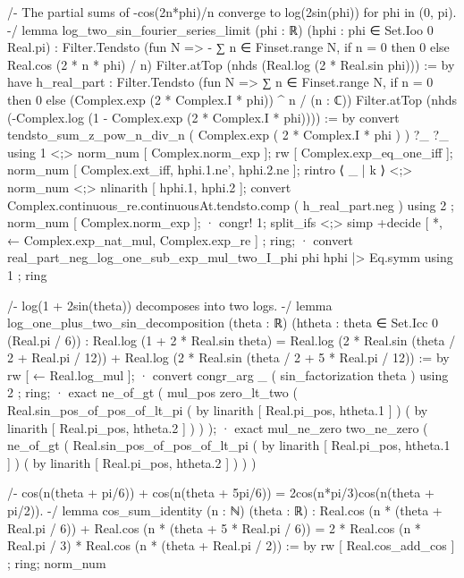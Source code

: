 /-
The partial sums of -cos(2n*phi)/n converge to log(2sin(phi)) for phi in (0, pi).
-/
lemma log_two_sin_fourier_series_limit (phi : ℝ) (hphi : phi ∈ Set.Ioo 0 Real.pi) :
  Filter.Tendsto (fun N => - ∑ n ∈ Finset.range N, if n = 0 then 0 else Real.cos (2 * n * phi) / n) Filter.atTop (nhds (Real.log (2 * Real.sin phi))) := by
    have h_real_part : Filter.Tendsto (fun N => ∑ n ∈ Finset.range N, if n = 0 then 0 else (Complex.exp (2 * Complex.I * phi)) ^ n / (n : ℂ)) Filter.atTop (nhds (-Complex.log (1 - Complex.exp (2 * Complex.I * phi)))) := by
      convert tendsto_sum_z_pow_n_div_n ( Complex.exp ( 2 * Complex.I * phi ) ) ?_ ?_ using 1 <;> norm_num [ Complex.norm_exp ];
      rw [ Complex.exp_eq_one_iff ];
      norm_num [ Complex.ext_iff, hphi.1.ne', hphi.2.ne ];
      rintro ⟨ _ | k ⟩ <;> norm_num <;> nlinarith [ hphi.1, hphi.2 ];
    convert Complex.continuous_re.continuousAt.tendsto.comp ( h_real_part.neg ) using 2 ; norm_num [ Complex.norm_exp ];
    · congr! 1;
      split_ifs <;> simp +decide [ *, ← Complex.exp_nat_mul, Complex.exp_re ] ; ring;
    · convert real_part_neg_log_one_sub_exp_mul_two_I_phi phi hphi |> Eq.symm using 1 ; ring

/-
log(1 + 2sin(theta)) decomposes into two logs.
-/
lemma log_one_plus_two_sin_decomposition (theta : ℝ) (htheta : theta ∈ Set.Icc 0 (Real.pi / 6)) :
  Real.log (1 + 2 * Real.sin theta) =
  Real.log (2 * Real.sin (theta / 2 + Real.pi / 12)) + Real.log (2 * Real.sin (theta / 2 + 5 * Real.pi / 12)) := by
    rw [ ← Real.log_mul ];
    · convert congr_arg _ ( sin_factorization theta ) using 2 ; ring;
    · exact ne_of_gt ( mul_pos zero_lt_two ( Real.sin_pos_of_pos_of_lt_pi ( by linarith [ Real.pi_pos, htheta.1 ] ) ( by linarith [ Real.pi_pos, htheta.2 ] ) ) );
    · exact mul_ne_zero two_ne_zero ( ne_of_gt ( Real.sin_pos_of_pos_of_lt_pi ( by linarith [ Real.pi_pos, htheta.1 ] ) ( by linarith [ Real.pi_pos, htheta.2 ] ) ) )

/-
cos(n(theta + pi/6)) + cos(n(theta + 5pi/6)) = 2cos(n*pi/3)cos(n(theta + pi/2)).
-/
lemma cos_sum_identity (n : ℕ) (theta : ℝ) :
  Real.cos (n * (theta + Real.pi / 6)) + Real.cos (n * (theta + 5 * Real.pi / 6)) =
  2 * Real.cos (n * Real.pi / 3) * Real.cos (n * (theta + Real.pi / 2)) := by
    rw [ Real.cos_add_cos ] ; ring;
    norm_num

